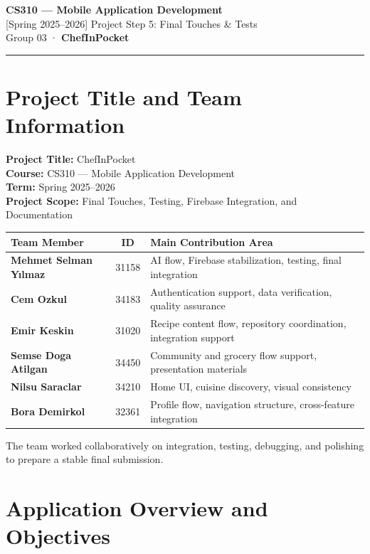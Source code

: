 \documentclass[11pt,a4paper]{article}
\begin{document}
\begin{center}
  {\large\bfseries CS310 --- Mobile Application Development}\\[4pt]
  {\large [Spring 2025--2026] Project Step 5: Final Touches \& Tests}\\[4pt]
  {\large Group 03 · \textbf{ChefInPocket}}
\end{center}

\medskip
\noindent\textcolor{border}{\rule{\linewidth}{0.4pt}}
\medskip

\section{Project Title and Team Information}

\textbf{Project Title:} ChefInPocket\\
\textbf{Course:} CS310 --- Mobile Application Development\\
\textbf{Term:} Spring 2025--2026\\
\textbf{Project Scope:} Final Touches, Testing, Firebase Integration, and Documentation

\begin{center}
\begin{tabularx}{0.96\textwidth}{>{\bfseries}l c X}
\toprule
Team Member & ID & Main Contribution Area \\
\midrule
Mehmet Selman Y{\i}lmaz & 31158 & AI flow, Firebase stabilization, testing, final integration \\
Cem Ozkul & 34183 & Authentication support, data verification, quality assurance \\
Emir Keskin & 31020 & Recipe content flow, repository coordination, integration support \\
Semse Doga Atilgan & 34450 & Community and grocery flow support, presentation materials \\
Nilsu Saraclar & 34210 & Home UI, cuisine discovery, visual consistency \\
Bora Demirkol & 32361 & Profile flow, navigation structure, cross-feature integration \\
\bottomrule
\end{tabularx}
\end{center}

The team worked collaboratively on integration, testing, debugging, and polishing to prepare a stable final submission.

\section{Application Overview and Objectives}
\end{document}
